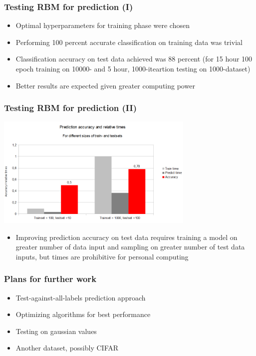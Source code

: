 \documentclass{beamer}
\begin{document}
  \begin{frame}
    \frametitle{Testing RBM for prediction (I)}
    \begin{itemize}
    \item Optimal hyperparameters for training phase were chosen
	\item Performing 100 percent accurate classification on training data was trivial 
	\item Classification accuracy on test data achieved was 88 percent (for 15 hour 100 epoch training on 10000- and 5 hour, 1000-iteartion testing on 1000-dataset)
	\item Better results are expected given greater computing power
	\end{itemize}
  \end{frame}
  \begin{frame}
    \frametitle{Testing RBM for prediction (II)}
    \includegraphics[width=9.5cm]{images/acc.png}
    \begin{itemize}
	\item Improving prediction accuracy on test data requires training a model on greater number of data input and sampling on greater number of test data inputs, but times are prohibitive for personal computing
	\end{itemize}
  \end{frame}
  \begin{frame}
    \frametitle{Plans for further work}
    \begin{itemize}
    \item Test-against-all-labels prediction approach
    \item Optimizing algorithms for best performance
	\item Testing on gaussian values
	\item Another dataset, possibly CIFAR
	\end{itemize}
  \end{frame}
\end{document}
